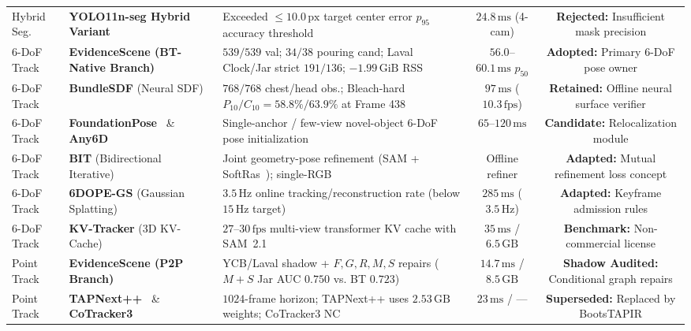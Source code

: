 \documentclass[10pt,journal]{IEEEtran}
\begin{document}
\begin{table}[t]
{\begin{tabular}{@{}llp{6.6cm}cc@{}}
        Hybrid Seg. & \textbf{YOLO11n-seg Hybrid Variant}~\cite{jocher2024yolo11} & Exceeded $\le 10.0\,\mathrm{px}$ target center error $p_{95}$ accuracy threshold & $24.8\,\mathrm{ms}$ (4-cam) & \textbf{Rejected:} Insufficient mask precision \\
        6-DoF Track & \textbf{EvidenceScene (BT-Native Branch)}~\cite{wen2021bundletrack} & $539/539$ val; $34/38$ pouring cand; Laval Clock/Jar strict $191/136$; $-1.99\,\mathrm{GiB}$ RSS & $56.0$--$60.1\,\mathrm{ms}$ $p_{50}$ & \textbf{Adopted:} Primary 6-DoF pose owner \\
        6-DoF Track & \textbf{BundleSDF} (Neural SDF)~\cite{wen2023bundlesdf} & $768/768$ chest/head obs.; Bleach-hard $P_{10}/C_{10}=58.8\%/63.9\%$ at Frame 438 & $97\,\mathrm{ms}$ ($10.3\,\mathrm{fps}$) & \textbf{Retained:} Offline neural surface verifier \\
        6-DoF Track & \textbf{FoundationPose}~\cite{wen2024foundationpose} \& \textbf{Any6D}~\cite{lee2025any6d} & Single-anchor / few-view novel-object 6-DoF pose initialization & $65$--$120\,\mathrm{ms}$ & \textbf{Candidate:} Relocalization module \\
        6-DoF Track & \textbf{BIT} (Bidirectional Iterative)~\cite{song2025bit} & Joint geometry-pose refinement (SAM + SoftRas~\cite{liu2019softras}); single-RGB & Offline refiner & \textbf{Adapted:} Mutual refinement loss concept \\
        6-DoF Track & \textbf{6DOPE-GS} (Gaussian Splatting)~\cite{jin20256dopegs} & $3.5\,\mathrm{Hz}$ online tracking/reconstruction rate (below $15\,\mathrm{Hz}$ target) & $285\,\mathrm{ms}$ ($3.5\,\mathrm{Hz}$) & \textbf{Adapted:} Keyframe admission rules \\
        6-DoF Track & \textbf{KV-Tracker} (3D KV-Cache)~\cite{elich2026kvtracker} & $27$--$30\,\mathrm{fps}$ multi-view transformer KV cache with SAM~2.1 & $35\,\mathrm{ms}$ / $6.5\,\mathrm{GB}$ & \textbf{Benchmark:} Non-commercial license \\
        Point Track & \textbf{EvidenceScene (P2P Branch)}~\cite{point2pose2026,doersch2024bootstap} & YCB/Laval shadow + $F,G,R,M,S$ repairs ($M+S$ Jar AUC $0.750$ vs. BT $0.723$) & $14.7\,\mathrm{ms}$ / $8.5\,\mathrm{GB}$ & \textbf{Shadow Audited:} Conditional graph repairs \\
        Point Track & \textbf{TAPNext++}~\cite{zholus2025tapnext} \& \textbf{CoTracker3}~\cite{karaev2024cotracker3} & $1024$-frame horizon; TAPNext++ uses $2.53\,\mathrm{GB}$ weights; CoTracker3 NC & $23\,\mathrm{ms}$ / --- & \textbf{Superseded:} Replaced by BootsTAPIR \\

\end{tabular}}
\end{table}
\end{document}
